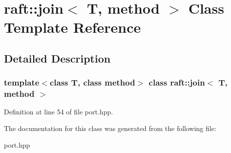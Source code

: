 \hypertarget{classraft_1_1join}{}\section{raft\+:\+:join$<$ T, method $>$ Class Template Reference}
\label{classraft_1_1join}


\subsection{Detailed Description}
\subsubsection*{template$<$class T, class method$>$\newline
class raft\+::join$<$ T, method $>$}



Definition at line 54 of file port.\+hpp.



The documentation for this class was generated from the following file\+:\begin{DoxyCompactItemize}
\item 
port.\+hpp\end{DoxyCompactItemize}
